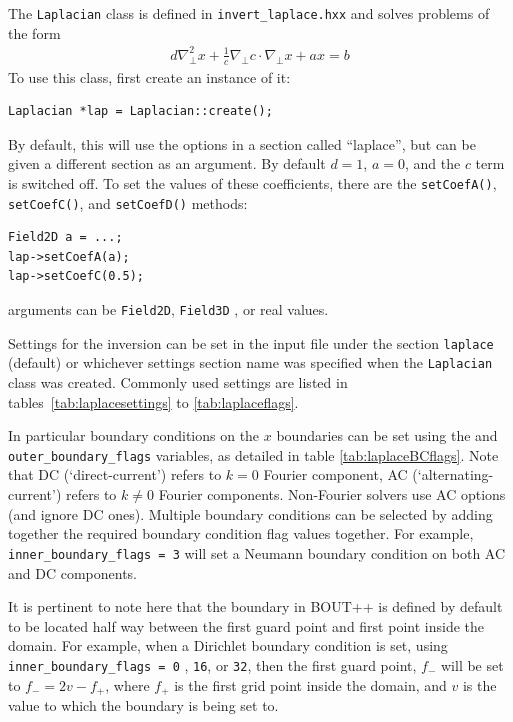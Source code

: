 \documentclass[12pt]{article}
\newcommand{\code}[1]{\texttt{#1}}
\begin{document}
The
%
\lstinline!Laplacian!
%
 class is defined in \texttt{invert\_laplace.hxx} and solves problems of the
 form
%
\begin{align}
d\nabla_\perp^2 x + \frac{1}{c}\nabla_\perp c \cdot\nabla_\perp x + a x = b
\end{align}
%
To use this class, first create an instance of it:
%
\begin{lstlisting}
Laplacian *lap = Laplacian::create();
\end{lstlisting}
%
By default, this will use the options in a section called ``laplace'', but can
be given a different section as an argument.  By default $d = 1$, $a = 0$, and
the $c$ term is switched off. To set the values of these coefficients, there
are the
%
\lstinline!setCoefA()!, \lstinline!setCoefC()!, and \lstinline!setCoefD()!
%
methods:
%
\begin{lstlisting}
Field2D a = ...;
lap->setCoefA(a);
lap->setCoefC(0.5);
\end{lstlisting}
%
arguments can be
%
\lstinline!Field2D!, \lstinline!Field3D!
%
, or real values.

Settings for the inversion can be set in the input file under the section
\code{laplace} (default) or whichever settings section name was specified when
the
%
\lstinline!Laplacian!
%
 class was created.  Commonly used settings are listed in
 tables~\ref{tab:laplacesettings} to \ref{tab:laplaceflags}.

In particular boundary conditions on the $x$ boundaries can be set using the
 and \code{outer\_boundary\_flags} variables, as
detailed in table \ref{tab:laplaceBCflags}.  Note that DC (`direct-current')
refers to $k = 0$ Fourier component, AC (`alternating-current') refers to $k 
\neq 0$ Fourier components.  Non-Fourier solvers use AC options (and ignore DC
ones).  Multiple boundary conditions can be selected by adding together the
required boundary condition flag values together.  For example,
%
\lstinline!inner_boundary_flags = 3!
%
 will set a Neumann boundary condition on both AC and DC components.

It is pertinent to note here that the boundary in BOUT++ is defined by default
to be located half way between the first guard point and first point inside the
domain.  For example, when a Dirichlet boundary condition is set, using
%
\lstinline!inner_boundary_flags = 0!
%
, \code{16}, or \code{32}, then the first guard point, $f_{-}$ will be set to
$f_{-} = 2v - f_+$, where $f_+$ is the first grid point inside the domain, and
$v$ is the value to which the boundary is being set to.
\end{document}
